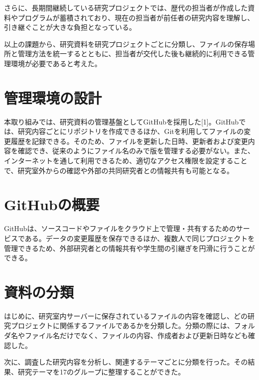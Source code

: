 \documentclass[
  10pt,       %
  twocolumn   %
]{jlreq}      %
\begin{document}
さらに、長期間継続している研究プロジェクトでは、歴代の担当者が作成した資料やプログラムが蓄積されており、現在の担当者が前任者の研究内容を理解し、引き継ぐことが大きな負担となっている。

以上の課題から、研究資料を研究プロジェクトごとに分類し、ファイルの保存場所と管理方法を統一するとともに、担当者が交代した後も継続的に利用できる管理環境が必要であると考えた。

\section{管理環境の設計}\label{sec:Section}  %
本取り組みでは、研究資料の管理基盤としてGitHubを採用した[1]。GitHubでは、研究内容ごとにリポジトリを作成できるほか、Gitを利用してファイルの変更履歴を記録できる。そのため、ファイルを更新した日時、更新者および変更内容を確認でき、従来のようにファイル名のみで版を管理する必要がない。また、インターネットを通して利用できるため、適切なアクセス権限を設定することで、研究室外からの確認や外部の共同研究者との情報共有も可能となる。

\section{GitHubの概要}\label{sec:Section}  %
GitHubは、ソースコードやファイルをクラウド上で管理・共有するためのサービスである。データの変更履歴を保存できるほか、複数人で同じプロジェクトを管理できるため、外部研究者との情報共有や学生間の引継ぎを円滑に行うことができる。

\section{資料の分類}\label{sec:Section}  %
はじめに、研究室内サーバーに保存されているファイルの内容を確認し、どの研究プロジェクトに関係するファイルであるかを分類した。分類の際には、フォルダ名やファイル名だけでなく、ファイルの内容、作成者および更新日時なども確認した。

次に、調査した研究内容を分析し、関連するテーマごとに分類を行った。その結果、研究テーマを17のグループに整理することができた。
\end{document}
